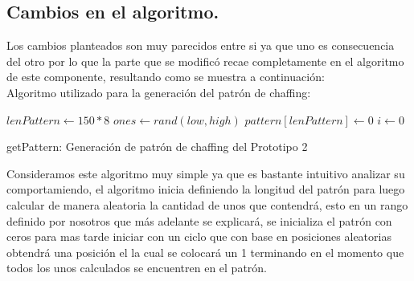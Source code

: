\documentclass[12pt, a4paper, titlepage]{report}
\begin{document}
		    \subsection{Cambios en el algoritmo.}
		        Los cambios planteados son muy parecidos entre si ya que uno es consecuencia del otro por lo que la parte que se modificó recae completamente en el algoritmo de este componente, resultando como se muestra a continuación:\\
		        Algoritmo utilizado para la generación del patrón de chaffing:\\
                \begin{algorithm}[H] %
                    \SetAlgoLined
                    $lenPattern \longleftarrow 150*8 $\;
                    $ones \longleftarrow rand(low,high) $\;
                    $pattern[lenPattern] \longleftarrow 0$\;
                    $i \longleftarrow 0$\;
                    \caption{getPattern: Generación de patrón de chaffing del Prototipo 2}
                \end{algorithm}
                Consideramos este algoritmo muy simple ya que es bastante intuitivo analizar su comportamiendo, el algoritmo inicia definiendo la longitud del patrón para luego calcular de manera aleatoria la cantidad de unos que contendrá, esto en un rango definido por nosotros que más adelante se explicará, se inicializa el patrón con ceros para mas tarde iniciar con un ciclo que con base en posiciones aleatorias obtendrá una posición el la cual se colocará un 1 terminando en el momento que todos los unos calculados se encuentren en el patrón.\\
\end{document}
